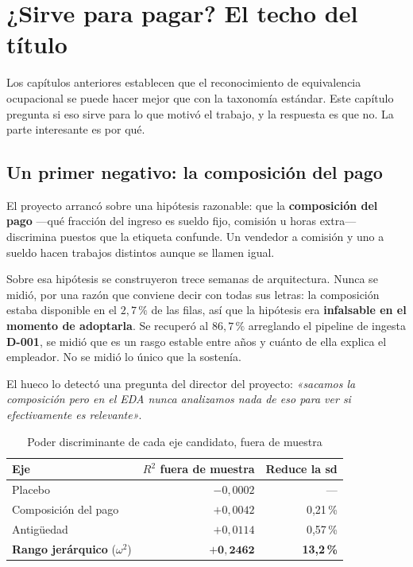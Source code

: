 \documentclass[12pt,a4paper,oneside]{report}
\newcommand{\dref}[1]{\textbf{D-#1}}
\begin{document}
\chapter{¿Sirve para pagar? El techo del título}
\label{cap:techo}

Los capítulos anteriores establecen que el reconocimiento de equivalencia ocupacional se
puede hacer mejor que con la taxonomía estándar. Este capítulo pregunta si eso sirve para
lo que motivó el trabajo, y la respuesta es que no. La parte interesante es por qué.

\section{Un primer negativo: la composición del pago}

El proyecto arrancó sobre una hipótesis razonable: que la \textbf{composición del pago}
---qué fracción del ingreso es sueldo fijo, comisión u horas extra--- discrimina puestos
que la etiqueta confunde. Un vendedor a comisión y uno a sueldo hacen trabajos distintos
aunque se llamen igual.

Sobre esa hipótesis se construyeron trece semanas de arquitectura. Nunca se midió, por una
razón que conviene decir con todas sus letras: la composición estaba disponible en el
$2{,}7\,\%$ de las filas, así que la hipótesis era \textbf{infalsable en el momento de
adoptarla}. Se recuperó al $86{,}7\,\%$ arreglando el pipeline de ingesta \dref{001}, se
midió que es un rasgo estable entre años y cuánto de ella explica el empleador. No se midió
lo único que la sostenía.

El hueco lo detectó una pregunta del director del proyecto: \emph{«sacamos la composición
pero en el EDA nunca analizamos nada de eso para ver si efectivamente es relevante»}.

\begin{table}[h]
\centering
\caption{Poder discriminante de cada eje candidato, fuera de muestra}
\label{tab:ejes}
\begin{tabular}{lrr}
\toprule
Eje & $R^2$ fuera de muestra & Reduce la sd \\
\midrule
Placebo & $-0{,}0002$ & --- \\
Composición del pago & $+0{,}0042$ & 0,21\,\% \\
Antigüedad & $+0{,}0114$ & 0,57\,\% \\
\textbf{Rango jerárquico} ($\omega^2$) & $\mathbf{+0{,}2462}$ & \textbf{13,2\,\%} \\
\bottomrule
\end{tabular}
\end{table}
\end{document}
